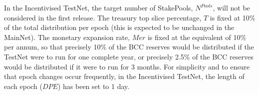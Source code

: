 \documentclass[11pt,a4paper,dvipsnames,twosided,final]{article}
\newcommand{\bcc}{BCC{}}
\newcommand{\BCC}[1]{\textbf{\emph{\bcc~{#1}}}}
\newcommand{\bcc}[1]{Bcc}
\begin{document}
\noindent
In the Incentivised TestNet,
the target number of StakePools, $N^{\textit{Pools}}$, will not be considered in the first release.
The treasury top slice percentage, $T$ is fixed at 10\% of the total distribution per epoch (this is expected to be unchanged in the MainNet).
The monetary expansion rate, $\textit{Mer}$ is fixed at the equivalent of 10\% per annum, so that precisely 10\% of the \bcc{} reserves would be distributed
if the TestNet were to run for one complete year, or precisely 2.5\% of the \bcc{} reserves would be distributed if it were to run for 3 months.
For simplicity and to ensure that epoch changes occur frequently, in the Incentivised TestNet, the length of each epoch ($\textit{DPE}$) has been set to 1 day.


\end{document}
